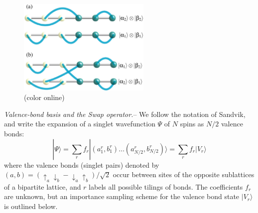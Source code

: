 \documentclass[prl,aps,twocolumn,floatfix,amsmath,amssymb,superscriptaddress,tightenlines]{revtex4}
\begin{document}
\begin{figure} {
\includegraphics[width=2.5in]{swap_2.eps} \caption{(color online) 
\label{swap_2}
}
} \end{figure}

{\it Valence-bond basis and the Swap operator.}-- We follow the notation of Sandvik, and write the expansion of a singlet
wavefunction $\Psi$ of $N$ spins as $N/2$ valence bonds:
\begin{equation}
| \Psi \rangle = \sum_r f_r|(a^r_1,b^r_1) \ldots (a^r_{N/2},b^r_{N/2}) \rangle = \sum_r f_r| V_r \rangle
\end{equation}
where the valence bonds (singlet pairs) denoted by $(a,b) = (\uparrow_a \downarrow_b - \downarrow_a \uparrow_b)/\sqrt{2}$ occur between sites of the opposite sublattices of a bipartite lattice, and $r$ labels all possible tilings of bonds.  The coefficients $f_r$ are unknown, but an importance sampling scheme for the valence bond state $| V_r \rangle$ is outlined below.  
\end{document}
